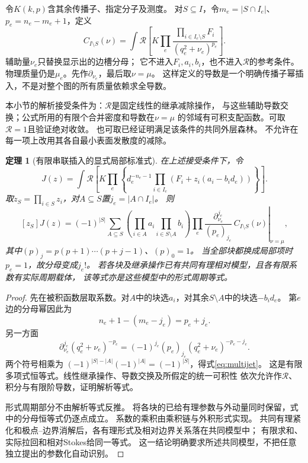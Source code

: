 \documentclass[11pt,a4paper]{ctexart}
\theoremstyle{cnplain}\newtheorem{theorem}{定理}[section]
\theoremstyle{definition}\newtheorem{definition}[theorem]{定义}
\theoremstyle{remark}\newtheorem{remark}[theorem]{注}
\begin{document}
令$K(k,p)$含其余传播子、指定分子及测度。
对$S\subseteq I$，令$m_e=|S\cap I_e|$、$p_e=n_e-m_e+1$，定义
\begin{equation}\label{eq:slotbase}
 C_{I\setminus S}(\nu)=
 \int {\mathcal R}\left[
 K\prod_e
 \frac{\prod_{i\in I_e\setminus S}F_i}
 {(q_e^2+\nu_e)^{p_e}}\right].
\end{equation}
辅助量$\nu_e$只替换显示出的边槽分母；
它不进入$F_i,a_i,b_i$，也不进入$\mathcal R$的参考条件。
物理质量仍是$\mu_e$。先作$\partial_{\nu_e}$，最后取$\nu=\mu$。
这样定义的导数是一个明确传播子幂插入，不是对整个图的所有质量依赖求全导数。

本小节的解析接受条件为：$\mathcal R$是固定线性的继承减除操作，
与这些辅助导数交换；公式所用的有限个合并密度和导数在$\nu=\mu$
的邻域有可积支配函数。可取$\mathcal R=1$且验证绝对收敛。
也可取已经证明满足该条件的共同外层森林。
不允许在每一项上改用其各自最小表面发散度的减除。

\begin{theorem}[有限串联插入的显式局部标准式]\label{thm:multijet}
在上述接受条件下，令
\[
 J(z)=\int\mathcal R\left[
 K\prod_e\left\{d_e^{-n_e-1}
       \prod_{i\in I_e}(F_i+z_i(a_i-b_i d_e))\right\}\right].
\]
取$z_S=\prod_{i\in S}z_i$，对$A\subseteq S$置$j_e=|A\cap I_e|$。
则
\begin{equation}\label{eq:multijet}
 [z_S]J(z)=(-1)^{|S|}
 \sum_{A\subseteq S}
 \left(\prod_{i\in A}a_i\prod_{i\in S\setminus A}b_i\right)
 \left.
 \prod_e\frac{\partial_{\nu_e}^{j_e}}{(p_e)_{j_e}}\,
 C_{I\setminus S}(\nu)\right|_{\nu=\mu},
\end{equation}
其中$(p)_j=p(p+1)\cdots(p+j-1)$、$(p)_0=1$。
当全部块都换成局部项时$p_e=1$，故分母变成$j_e!$。
若各块及继承操作已有共同有理相对模型，且各有限系数有实际周期载体，
该等式亦是这些模型中的形式周期等式。
\end{theorem}
\begin{proof}
先在被积函数层取系数。对$A$中的块选$a_i$，对其余$S\setminus A$中的块选$-b_i d_e$。
第$e$边的分母幂因此为
\[
 n_e+1-(m_e-j_e)=p_e+j_e.
\]
另一方面
\[
 \partial_{\nu_e}^{j_e}(q_e^2+\nu_e)^{-p_e}
   =(-1)^{j_e}(p_e)_{j_e}(q_e^2+\nu_e)^{-p_e-j_e}.
\]
两个符号相乘为
$(-1)^{|S|-|A|}(-1)^{|A|}=(-1)^{|S|}$，得式\eqref{eq:multijet}。
这是有限多项式恒等式。线性继承操作、导数交换及所假定的统一可积性
依次允许作$\mathcal R$、积分与有限阶导数，证明解析等式。

形式周期部分不由解析等式反推。
将各块的已给有理参数与外动量同时保留，式中的分母恒等式仍逐点成立。
系数的乘积由乘积链与外积形式实现。
共同有理紧化和极点--边界消解后，各有理形式及相对边界关系落在共同模型中；
有限求和、实际拉回和相对Stokes给同一等式。
这一结论明确要求所述共同模型，不把任意独立提出的参数化自动识别。
\end{proof}
\end{document}
